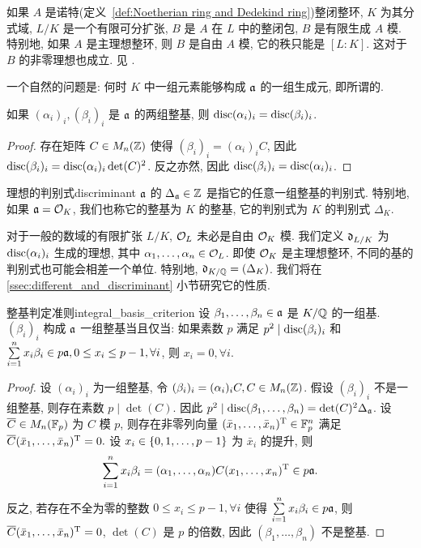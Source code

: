 \begin{remark}\label{rem:integral_closure_over_pid_admits_basis}
如果 $A$ 是诺特(定义~\ref{def:Noetherian ring and Dedekind ring})整闭整环, $K$ 为其分式域, $L/K$ 是一个有限可分扩张, $B$ 是 $A$ 在 $L$ 中的整闭包, $B$ 是有限生成 $A$ 模. 特别地, 如果 $A$ 是主理想整环, 则 $B$ 是自由 $A$ 模, 它的秩只能是 $[L:K]$. 这对于 $B$ 的非零理想也成立. 见 \cite[I \S2, Theorem~1]{Lang1994}.
\end{remark}

一个自然的问题是: 何时 $K$ 中一组元素能够构成 ${\mathfrak{a}}$ 的一组生成元, 即所谓的.

\begin{proposition}{}{}
如果 $(\alpha_i)_i,(\beta_i)_i$ 是 ${\mathfrak{a}}$ 的两组整基, 则 ${\mathrm{disc}}(\alpha_i)_i={\mathrm{disc}}(\beta_i)_i$.
\end{proposition}
\begin{proof}
存在矩阵 $C\in M_n({\mathbb{Z}})$ 使得 $(\beta_i)_i=(\alpha_i)_i C$, 因此 ${\mathrm{disc}}(\beta_i)_i={\mathrm{disc}}(\alpha_i)_i\det(C)^2$. 反之亦然, 因此 ${\mathrm{disc}}(\beta_i)_i={\mathrm{disc}}(\alpha_i)_i$.
\end{proof}

\begin{definition}{理想的判别式}{discriminant}
${\mathfrak{a}}$ 的 $\Delta_{\mathfrak{a}}\in{\mathbb{Z}}$ 是指它的任意一组整基的判别式. 特别地, 如果 ${\mathfrak{a}}={\mathcal{O}}_K$, 我们也称它的整基为 $K$ 的整基, 它的判别式为 $K$ 的判别式 $\Delta_K$.
\end{definition}

\begin{remark}
对于一般的数域的有限扩张 $L/K$, ${\mathcal{O}}_L$ 未必是自由 ${\mathcal{O}}_K$ 模. 我们定义 ${\mathfrak{d}}_{L/K}$ 为 ${\mathrm{disc}}(\alpha_i)_i$ 生成的理想, 其中 $\alpha_1,\dots,\alpha_n\in {\mathcal{O}}_L$. 即使 ${\mathcal{O}}_K$ 是主理想整环, 不同的基的判别式也可能会相差一个单位. 特别地, ${\mathfrak{d}}_{K/{\mathbb{Q}}}=(\Delta_K)$. 我们将在 \ref{ssec:different_and_discriminant} 小节研究它的性质.
\end{remark}


\begin{lemma}{整基判定准则}{integral_basis_criterion}
设 $\beta_1,\dots,\beta_n\in {\mathfrak{a}}$ 是 $K/{\mathbb{Q}}$ 的一组基. $(\beta_i)_i$ 构成 ${\mathfrak{a}}$ 一组整基当且仅当: 如果素数 $p$ 满足 $p^2\mid{\mathrm{disc}}(\beta_i)_i$ 和 $\sum\limits_{i=1}^n x_i\beta_i\in p{\mathfrak{a}}, 0\le x_i\le p-1, \forall i$, 则 $x_i=0,\forall i$.
\end{lemma}
\begin{proof}
设 $(\alpha_i)_i$ 为一组整基, 令 $(\beta_i)_i=(\alpha_i)_iC,C\in M_n({\mathbb{Z}})$. 假设 $(\beta_i)_i$ 不是一组整基, 则存在素数 $p\mid \det(C)$. 因此 $p^2\mid {\mathrm{disc}}(\beta_1,\dots,\beta_n)=\det(C)^2 \Delta_{\mathfrak{a}}$. 设 $\overline C\in M_n({\mathbb{F}}_p)$ 为 $C$ 模 $p$, 则存在非零列向量 $(\bar x_1,\dots,\bar x_n)^{\mathrm{T}}\in{\mathbb{F}}_p^n$ 满足 $\overline C(\bar x_1,\dots,\bar x_n)^{\mathrm{T}}=0.$ 设 $x_i\in\left\{0,1,\dots,p-1\right\}$ 为 $\bar x_i$ 的提升, 则 
	\[\sum_{i=1}^n x_i\beta_i=(\alpha_1,\dots,\alpha_n) C(x_1,\dots,x_n)^{\mathrm{T}}\in p{\mathfrak{a}}.\]
反之, 若存在不全为零的整数 $0\le x_i\le p-1, \forall i$ 使得 $\sum\limits_{i=1}^n x_i\beta_i\in p{\mathfrak{a}}$, 则 $\overline C (\bar x_1,\dots,\bar x_n)^{\mathrm{T}}=0$, $\det(C)$ 是 $p$ 的倍数, 因此 $(\beta_1,\dots,\beta_n)$ 不是整基. 
\end{proof}

